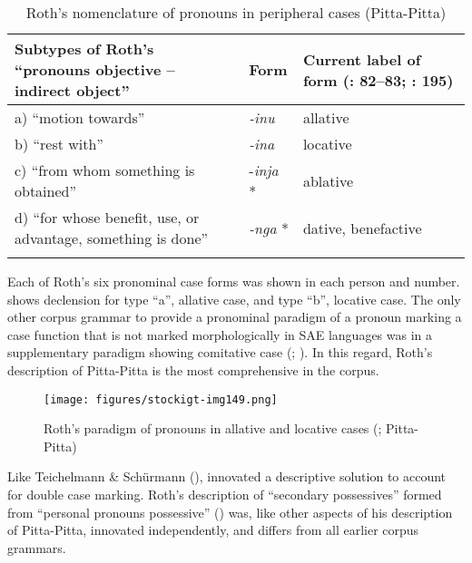 \begin{table}
\small
\begin{tabularx}{\textwidth}{p{5.5cm}lQ}
\lsptoprule
 {\raggedright Subtypes of Roth’s “pronouns objective – indirect object''}
 &  {Form}
 & {  {Current label of form}} {{(\citealt{blake_pitta-pitta_1971}: 82--83;}}  {\citealt{blake_australian_1979}: 195)}\\
\midrule
a) “motion towards” & \textit{{}-inu}
 & allative\\
b) “rest with” & \textit{{}-ina}
 & locative\\
c) “from whom something is obtained” & {}-\textit{inja} * & ablative\\
d) “for whose benefit, use, or advantage, something is done” & \textit{{}-nga} * & dative, benefactive\\
\lspbottomrule
\end{tabularx}
\caption{Roth’s nomenclature of pronouns in peripheral cases \citeyearpar[4]{roth_ethnological_1897} (Pitta-Pitta)}
\label{bkm:Ref323829014}
\label{fig:key:202}
\end{table}

Each of Roth’s six pronominal case forms was shown in each person and number.  shows declension for type “a'', allative case, and type “b'', locative case. The only other corpus grammar to provide a pronominal paradigm of a pronoun marking a case function that is not marked morphologically in SAE languages was \citet[8]{teichelmann_outlines_1840} in a supplementary paradigm showing comitative case (\citealt{Stockigt2017}; ). In this regard, Roth’s description of Pitta-Pitta is the most comprehensive in the corpus.


\begin{figure}
\texttt{[image: figures/stockigt-img149.png]}
\caption{Roth’s paradigm of pronouns in allative and locative cases (\citeyear[4]{roth_ethnological_1897}; Pitta-Pitta)}
\label{bkm:Ref323761032}
\label{fig:key:203}
\end{figure}

Like Teichelmann \& Schürmann (), \citet[7]{roth_ethnological_1897} innovated a descriptive solution to account for double case marking. Roth’s description of “secondary possessives” formed from “personal pronouns possessive” () was, like other aspects of his description of Pitta-Pitta, innovated independently, and differs from all earlier corpus grammars.


